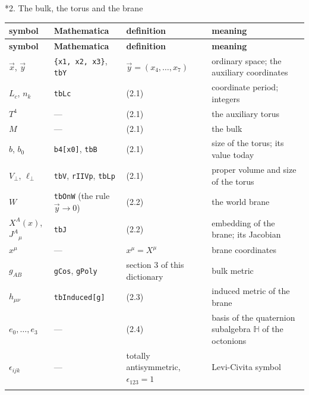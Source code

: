 \documentclass[10pt,a4paper]{article}
\makeatletter
\renewcommand\section{\@startsection{section}{1}{\z@}{-3.5ex \@plus -1ex \@minus -.2ex}{2.3ex \@plus.2ex}{\normalfont\Large\bfseries\raggedright}}
\makeatother
\begin{document}
\section*{2. The bulk, the torus and the brane}
{\footnotesize
\begin{longtable}{>{\raggedright\arraybackslash}p{}>{\raggedright\arraybackslash}p{}>{\raggedright\arraybackslash}p{}>{\raggedright\arraybackslash}p{}}
\toprule
\textbf{symbol} & \textbf{Mathematica} & \textbf{definition} & \textbf{meaning} \\
\midrule\endfirsthead
\toprule
\textbf{symbol} & \textbf{Mathematica} & \textbf{definition} & \textbf{meaning} \\
\midrule\endhead
\endfoot
\bottomrule\endlastfoot
$\vec x$, $\vec y$ & \texttt{\{x1, x2, x3\}}, \texttt{tbY} & $\vec y=(x_4,\dots,x_7)$ & ordinary space; the auxiliary coordinates \\
$L_c$, $n_k$ & \texttt{tbLc} & (2.1) & coordinate period; integers \\
$T^4$ & — & (2.1) & the auxiliary torus \\
$M$ & — & (2.1) & the bulk \\
$b$, $b_0$ & \texttt{b4[x0]}, \texttt{tbB} & (2.1) & size of the torus; its value today \\
$V_\perp$, $\ell_\perp$ & \texttt{tbV}, \texttt{rIIVp}, \texttt{tbLp} & (2.1) & proper volume and size of the torus \\
$W$ & \texttt{tbOnW} (the rule $\vec y\to0$) & (2.2) & the world brane \\
$X^A(x)$, $J^A{}_\mu$ & \texttt{tbJ} & (2.2) & embedding of the brane; its Jacobian \\
$x^\mu$ & — & $x^\mu=X^\mu$ & brane coordinates \\
$g_{AB}$ & \texttt{gCos}, \texttt{gPoly} & section 3 of this dictionary & bulk metric \\
$h_{\mu\nu}$ & \texttt{tbInduced[g]} & (2.3) & induced metric of the brane \\
$e_0,\dots,e_3$ & — & (2.4) & basis of the quaternion subalgebra $\mathbb H$ of the octonions \\
$\epsilon_{ijk}$ & — & totally antisymmetric, $\epsilon_{123}=1$ & Levi-Civita symbol \\*
\end{longtable}}
\end{document}
